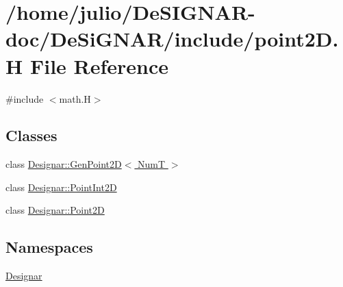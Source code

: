 \hypertarget{point2_d_8_h}{}\section{/home/julio/\+De\+S\+I\+G\+N\+A\+R-\/doc/\+De\+Si\+G\+N\+A\+R/include/point2D.H File Reference}
\label{point2_d_8_h}
{\ttfamily \#include $<$math.\+H$>$}\newline
\subsection*{Classes}
\begin{DoxyCompactItemize}
\item 
class \hyperlink{class_designar_1_1_gen_point2_d}{Designar\+::\+Gen\+Point2\+D$<$ Num\+T $>$}
\item 
class \hyperlink{class_designar_1_1_point_int2_d}{Designar\+::\+Point\+Int2D}
\item 
class \hyperlink{class_designar_1_1_point2_d}{Designar\+::\+Point2D}
\end{DoxyCompactItemize}
\subsection*{Namespaces}
\begin{DoxyCompactItemize}
\item 
 \hyperlink{namespace_designar}{Designar}
\end{DoxyCompactItemize}

